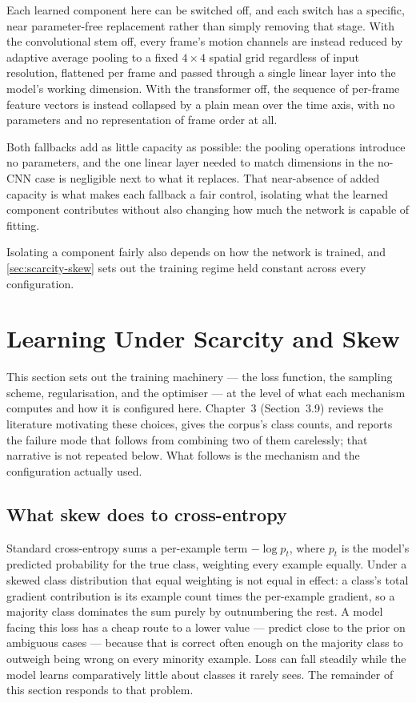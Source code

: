 Each learned component here can be switched off, and each switch has a specific, near parameter-free replacement rather than simply removing that stage. With the convolutional stem off, every frame's motion channels are instead reduced by adaptive average pooling to a fixed $4\times4$ spatial grid regardless of input resolution, flattened per frame and passed through a single linear layer into the model's working dimension. With the transformer off, the sequence of per-frame feature vectors is instead collapsed by a plain mean over the time axis, with no parameters and no representation of frame order at all.

Both fallbacks add as little capacity as possible: the pooling operations introduce no parameters, and the one linear layer needed to match dimensions in the no-CNN case is negligible next to what it replaces. That near-absence of added capacity is what makes each fallback a fair control, isolating what the learned component contributes without also changing how much the network is capable of fitting.

Isolating a component fairly also depends on how the network is trained, and \autoref{sec:scarcity-skew} sets out the training regime held constant across every configuration.


\section{Learning Under Scarcity and Skew}
\label{sec:scarcity-skew}

This section sets out the training machinery --- the loss function, the sampling scheme, regularisation, and the optimiser --- at the level of what each mechanism computes and how it is configured here. Chapter~3 (Section~3.9) reviews the literature motivating these choices, gives the corpus's class counts, and reports the failure mode that follows from combining two of them carelessly; that narrative is not repeated below. What follows is the mechanism and the configuration actually used.

\subsection{What skew does to cross-entropy}
\label{sec:skew-cross-entropy}

Standard cross-entropy sums a per-example term $-\log p_t$, where $p_t$ is the model's predicted probability for the true class, weighting every example equally. Under a skewed class distribution that equal weighting is not equal in effect: a class's total gradient contribution is its example count times the per-example gradient, so a majority class dominates the sum purely by outnumbering the rest. A model facing this loss has a cheap route to a lower value --- predict close to the prior on ambiguous cases --- because that is correct often enough on the majority class to outweigh being wrong on every minority example. Loss can fall steadily while the model learns comparatively little about classes it rarely sees. The remainder of this section responds to that problem.

